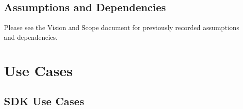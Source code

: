 \documentclass[12pt,oneside,letterpaper]{article}
\begin{document}
\subsection{Assumptions and Dependencies}
Please see the Vision and Scope document for previously recorded assumptions and dependencies.


\clearpage
\section{Use Cases}
\subsection{SDK Use Cases}
\end{document}

